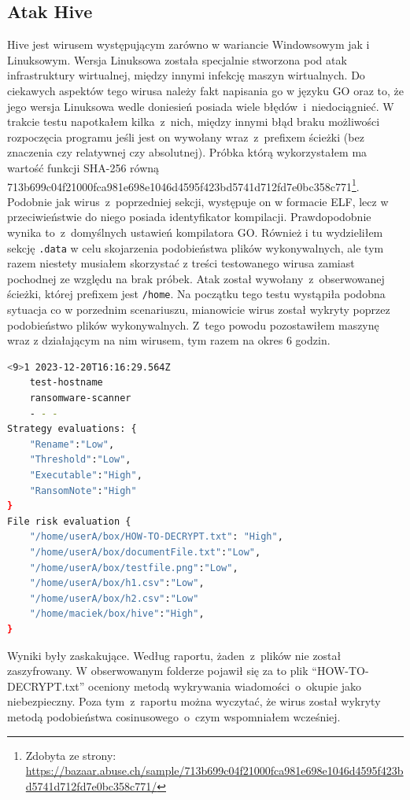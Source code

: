 \subsection{Atak Hive}
Hive jest wirusem występującym zarówno w wariancie Windowsowym 
jak i Linuksowym. 
Wersja Linuksowa została specjalnie stworzona pod atak infrastruktury wirtualnej, między 
innymi infekcję maszyn wirtualnych. Do ciekawych aspektów tego wirusa należy fakt napisania go w języku GO oraz to, że jego wersja Linuksowa wedle doniesień posiada wiele błędów~i~niedociągnieć. W trakcie testu napotkałem kilka~z~nich, między innymi błąd braku możliwości rozpoczęcia programu jeśli jest on wywołany wraz~z~prefixem ścieżki (bez znaczenia czy relatywnej czy absolutnej).
Próbka którą wykorzystałem ma wartość funkcji SHA-256 równą
713b699c04f21000fca981e698e1046d4595f423bd5741d712fd7e0bc358c771\footnote{Zdobyta ze strony: \url{https://bazaar.abuse.ch/sample/713b699c04f21000fca981e698e1046d4595f423bd5741d712fd7e0bc358c771/}}. Podobnie jak wirus~z~poprzedniej sekcji, występuje on w formacie ELF, lecz w przeciwieństwie do niego posiada identyfikator kompilacji. Prawdopodobnie wynika to~z~domyślnych ustawień kompilatora GO. Również i tu wydzieliłem sekcję \texttt{.data} w celu skojarzenia podobieństwa plików wykonywalnych, ale tym razem niestety musiałem skorzystać z treści testowanego wirusa zamiast pochodnej ze względu na brak próbek. Atak został wywołany~z~obserwowanej ścieżki, której prefixem jest \texttt{/home}. Na początku tego testu wystąpiła podobna sytuacja co w porzednim scenariuszu, mianowicie wirus został wykryty poprzez podobieństwo plików wykonywalnych. Z~tego powodu pozostawiłem maszynę wraz z działającym na nim wirusem, tym razem na okres 6 godzin.
\begin{lstlisting}[language=bash,
    backgroundcolor=\color{EEGold!5!white},
    caption={Późniejszy raport~z~ataku Hive.},
    label={lst:raportau}]
    <9>1 2023-12-20T16:16:29.564Z
    test-hostname 
    ransomware-scanner 
    - - -  
Strategy evaluations: {
    "Rename":"Low",
    "Threshold":"Low",
    "Executable":"High",
    "RansomNote":"High"
}
File risk evaluation {
    "/home/userA/box/HOW-TO-DECRYPT.txt": "High",
    "/home/userA/box/documentFile.txt":"Low",
    "/home/userA/box/testfile.png":"Low",
    "/home/userA/box/h1.csv":"Low",
    "/home/userA/box/h2.csv":"Low"
    "/home/maciek/box/hive":"High",
}
\end{lstlisting}
Wyniki były zaskakujące. Według raportu, żaden~z~plików nie został zaszyfrowany. W obserwowanym folderze pojawił się za to plik \foreignquote{english}{HOW-TO-DECRYPT.txt} oceniony metodą wykrywania wiadomości~o~okupie jako niebezpieczny. Poza tym~z~raportu można wyczytać, że wirus został wykryty metodą podobieństwa cosinusowego~o~czym wspomniałem wcześniej.
